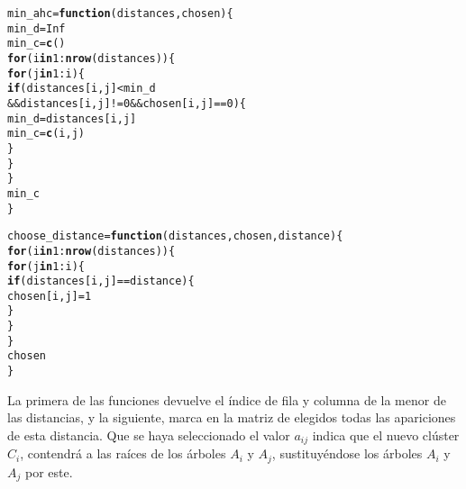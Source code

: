 \documentclass[12pt]{report}\usepackage[]{graphicx}\usepackage[dvipsnames]{xcolor}
\makeatletter
\newcommand{\hlnum}[1]{\textcolor[rgb]{0.686,0.059,0.569}{#1}}%
\newcommand{\hlopt}[1]{\textcolor[rgb]{0,0,0}{#1}}%
\newcommand{\hlstd}[1]{\textcolor[rgb]{0.345,0.345,0.345}{#1}}%
\newcommand{\hlkwa}[1]{\textcolor[rgb]{0.161,0.373,0.58}{\textbf{#1}}}%
\newcommand{\hlkwb}[1]{\textcolor[rgb]{0.69,0.353,0.396}{#1}}%
\newcommand{\hlkwc}[1]{\textcolor[rgb]{0.333,0.667,0.333}{#1}}%
\newcommand{\hlkwd}[1]{\textcolor[rgb]{0.737,0.353,0.396}{\textbf{#1}}}%
\newenvironment{kframe}{%
 \def\at@end@of@kframe{}%
 \ifinner\ifhmode%
  \def\at@end@of@kframe{\end{minipage}}%
  \begin{minipage}{\columnwidth}%
 \fi\fi%
 \def\FrameCommand##1{\hskip\@totalleftmargin \hskip-\fboxsep
 \colorbox{shadecolor}{##1}\hskip-\fboxsep
     \hskip-\linewidth \hskip-\@totalleftmargin \hskip\columnwidth}%
 \MakeFramed {\advance\hsize-\width
   \@totalleftmargin\z@ \linewidth\hsize
   \@setminipage}}%
 {\par\unskip\endMakeFramed%
 \at@end@of@kframe}
\newenvironment{knitrout}{}{} %
\makeatother
\begin{document}
\begin{knitrout}
\color{fgcolor}\begin{kframe}
\begin{alltt}
\hlstd{min_ahc} \hlkwb{=} \hlkwa{function}\hlstd{(}\hlkwc{distances}\hlstd{,} \hlkwc{chosen}\hlstd{) \{}
        \hlstd{min_d} \hlkwb{=} \hlnum{Inf}
        \hlstd{min_c} \hlkwb{=} \hlkwd{c}\hlstd{()}
        \hlkwa{for}\hlstd{(i} \hlkwa{in} \hlnum{1}\hlopt{:}\hlkwd{nrow}\hlstd{(distances)) \{}
                \hlkwa{for}\hlstd{(j} \hlkwa{in} \hlnum{1}\hlopt{:}\hlstd{i) \{}
                        \hlkwa{if} \hlstd{(distances[i, j]} \hlopt{<} \hlstd{min_d}
                         \hlopt{&&} \hlstd{distances[i, j]} \hlopt{!=} \hlnum{0} \hlopt{&&} \hlstd{chosen[i, j]} \hlopt{==} \hlnum{0}\hlstd{) \{}
                                \hlstd{min_d} \hlkwb{=} \hlstd{distances[i, j]}
                                \hlstd{min_c} \hlkwb{=} \hlkwd{c}\hlstd{(i, j)}
                        \hlstd{\}}
                \hlstd{\}}
        \hlstd{\}}
        \hlstd{min_c}
\hlstd{\}}

\hlstd{choose_distance} \hlkwb{=} \hlkwa{function}\hlstd{(}\hlkwc{distances}\hlstd{,} \hlkwc{chosen}\hlstd{,} \hlkwc{distance}\hlstd{)\{}
        \hlkwa{for}\hlstd{(i} \hlkwa{in} \hlnum{1}\hlopt{:}\hlkwd{nrow}\hlstd{(distances)) \{}
                \hlkwa{for}\hlstd{(j} \hlkwa{in} \hlnum{1}\hlopt{:}\hlstd{i) \{}
                        \hlkwa{if} \hlstd{(distances[i, j]} \hlopt{==} \hlstd{distance) \{}
                                \hlstd{chosen[i, j]} \hlkwb{=} \hlnum{1}
                        \hlstd{\}}
                \hlstd{\}}
        \hlstd{\}}
        \hlstd{chosen}
\hlstd{\}}
\end{alltt}
\end{kframe}
\end{knitrout}
		 		
		 		La primera de las funciones devuelve el índice de fila y columna de la menor de las distancias, y la siguiente, marca en la matriz de elegidos todas las apariciones de esta distancia. Que se haya seleccionado el valor $a_{ij}$ indica que el nuevo clúster $C_i$, contendrá a las raíces de los árboles $A_i$ y $A_j$, sustituyéndose los árboles $A_i$ y $A_j$ por este. \\
		 		
\end{document}
